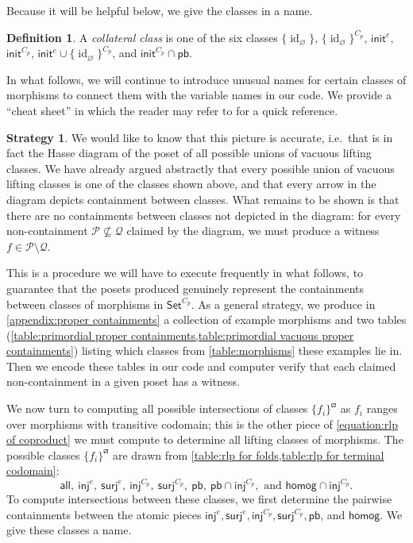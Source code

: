 \documentclass{amsart}
\renewcommand\emptyset\varnothing
\newcommand{\Set}{\mathsf{Set}}
\newcommand{\CpSet}{\Set^{C_p}}
\newcommand{\all}{\mathsf{all}}
\newcommand{\inj}{\mathsf{inj}}
\newcommand{\surj}{\mathsf{surj}}
\newcommand{\init}{\mathsf{init}}
\newcommand{\pb}{\mathsf{pb}}
\newcommand{\homog}{\mathsf{homog}}
\DeclareMathOperator{\id}{id}
\numberwithin{equation}{section}
\theoremstyle{definition}
\newtheorem{definition}[equation]{Definition}
\newtheorem{strategy}[equation]{Strategy}
\begin{document}
Because it will be helpful below, we give the classes in  a name.

\begin{definition}
	A \textit{collateral class} is one of the six classes $\{\id_\emptyset\}$, $\{\id_\emptyset\}^{C_p}$, $\init^e$, $\init^{C_p}$, $\init^e \cup \{\id_\emptyset\}^{C_p}$, and $\init^{C_p} \cap \pb$.
\end{definition}

In what follows, we will continue to introduce unusual names for certain classes of morphisms to connect them with the variable names in our code. We provide a ``cheat sheet'' in  which the reader may refer to for a quick reference.

\begin{strategy}
	\label{strategy}
	We would like to know that this picture is accurate, i.e.\ that  is in fact the Hasse diagram of the poset of all possible unions of vacuous lifting classes. We have already argued abstractly that every possible union of vacuous lifting classes is one of the classes shown above, and that every arrow in the diagram depicts containment between classes. What remains to be shown is that there are no containments between classes not depicted in the diagram: for every non-containment $\mathcal P \nsubseteq \mathcal Q$ claimed by the diagram, we must produce a witness $f \in \mathcal P \setminus \mathcal Q$.

	This is a procedure we will have to execute frequently in what follows, to guarantee that the posets produced genuinely represent the containments between classes of morphisms in $\CpSet$. As a general strategy, we produce in \cref{appendix:proper containments} a collection of example morphisms and two tables (\cref{table:primordial proper containments,table:primordial vacuous proper containments}) listing which classes from \cref{table:morphisms} these examples lie in. Then we encode these tables in our code \cite{code} and computer verify that each claimed non-containment in a given poset has a witness. 
\end{strategy}

\bigskip

We now turn to computing all possible intersections of classes $\{f_i\}^\boxslash$ as $f_i$ ranges over morphisms with transitive codomain; this is the other piece of \cref{equation:rlp of coproduct} we must compute to determine all lifting classes of morphisms. The possible classes $\{f_i\}^\boxslash$ are drawn from \cref{table:rlp for folds,table:rlp for terminal codomain}:
\begin{equation}
	\label{equation:right lifting classes}
	\all,\
	\inj^e,\
	\surj^e,\
	\inj^{C_p},\
	\surj^{C_p},\
	\pb, \
	\pb \cap \inj^{C_p}, \text{ and }
	\homog \cap \inj^{C_p}.
\end{equation}
To compute intersections between these classes, we first determine the pairwise containments between the atomic pieces $\inj^e, \surj^e, \inj^{C_p}, \surj^{C_p}, \pb$, and $\homog$. We give these classes a name.
\end{document}
